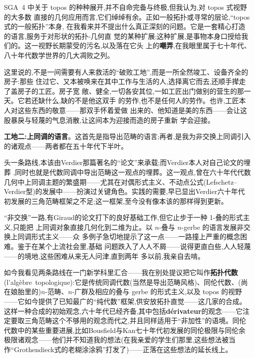 SGA~4 中关于 topos 的种种展开,并不自命完备与终极,但我认为,对 topos 式视野的大多数
直接的几何应用而言,它们绰绰有余。正如一般拓扑或寻常的层论,“topos 式的一般拓扑”本身,
在我看来并不提出什么真正深刻的问题。它是一套精心打造的语言,服务于对形状的拓扑-几何直
觉的某种扩展;这种扩展,是事物本身口授给我们的。这一视野长期蒙受的污名,以及落在它头
上的\textbf{嘲弄},在我眼里属于七十年代、八十年代数学世界的几大凋败之列。

这里说的,不是一间需要有人来救活的“破败工地”,而是一所全然竣工、设备齐全的房子:那些
住过它、又本被唤来在其中工作与生活的人,选择离它而去,还顺手撵走了盖房子的工匠。房子宽
敞、健全,一切各安其位,一如工匠出门做别的营生的那一天。它若还缺什么,缺的\dmark{}不是他这双手
的劳作,也不是任何人的劳作。也许,工匠本人对这些东西的敬意——那双手怀着爱做
出来的、他知道是美的东西——会让这股暴戾与轻蔑的气息消散,让这间本为迎接而造的房子重新
学会迎接。

\textbf{工地二:上同调的语言}。这首先是指导出范畴的语言;再者,是我为非交换上同调引入
的诸观点——两者都在五十年代下半叶。

头一条路线,本该由Verdier那篇著名的“论文”来承载;而Verdier本人对自己论文的埋葬
,同时也就是代数同调中导出范畴这一观点的埋葬。这一观点,曾在六十年代代数几何中上同调主题的繁盛期——尤其在对偶形式主义、不动点公式(Lefschetz--Verdier型)的发展中——扮演过关键角色。实践的需要,早已显出Verdier六十年代初发展的三角范畴框架之不足;这一框架,至今没有像本该的那样得到更新。

“非交换”一路,有Giraud的论文打下的良好基础工作,但它止步于一种 1-叠的形式主义,只能把
上同调对象直接几何化到二维为止。以 $n$-叠与 $n$-gerbe 的语言发展非交换上同调形式主义——众
多例子急切地提示了这一点——一路撞上严重的概念困难。鉴于在某个上流社会里,基础
问题跌入了人人不屑——说得更直白些,人人轻蔑——的境地,这些困难从来无人问津,直到两年
多以前,我亲自去啃。

\pmark{}如今我看见两条路线在一门新学科里汇合——我在别处提议把它叫作\textbf{拓扑代数}(l'algèbre~topologique):它是传统同调代数(当然是导出范畴风格)、同伦代数、(尚在娘胎里的)$n$-范畴、$n$-广群及相应的叠与 gerbe 的形式主义,以及 topos 的视野——它如今提供了已知最广的“纯代数”框架,供安放拓扑直觉——这几家的合成。这样一种合成的初始观念,六十年代已经齐备,其中包括\textbf{dérivateur}的观念——它注定要取三角范畴这个不够用的观念而代之,并且同样适用于“非加性”的语境。同伦代数中的某些重要进展,比如Bousfield与Kan七十年代初发展的同伦极限与同伦余极限诸观念——他们并不知道我的想法(在我亲爱的学生们那里,这些想法被当作“Grothendieck式的老糊涂涂鸦”打发了)——正落在这些想法的延长线上。

